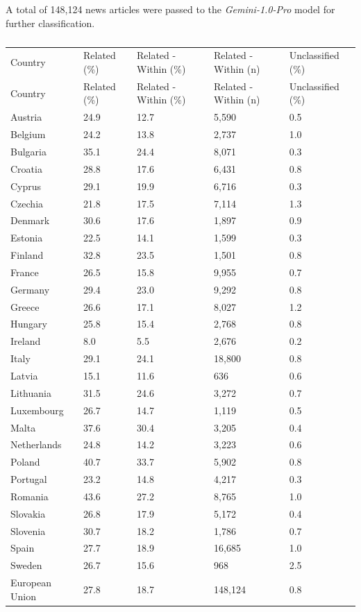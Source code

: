\documentclass[
]{agujournal2019}
\begin{document}
A total of 148,124 news articles were passed to the
\emph{Gemini-1.0-Pro} model for further classification.

\begin{longtable}[]{@{}lllll@{}}

\caption{\label{tbl-classstage1}Broad classification results}

\tabularnewline

\caption{}\label{T_9487f}\tabularnewline
\toprule\noalign{}
Country & Related (\%) & Related - Within (\%) & Related - Within (n) &
Unclassified (\%) \\
\midrule\noalign{}
\endfirsthead
\toprule\noalign{}
Country & Related (\%) & Related - Within (\%) & Related - Within (n) &
Unclassified (\%) \\
\midrule\noalign{}
\endhead
\bottomrule\noalign{}
\endlastfoot
Austria & 24.9 & 12.7 & 5,590 & 0.5 \\
Belgium & 24.2 & 13.8 & 2,737 & 1.0 \\
Bulgaria & 35.1 & 24.4 & 8,071 & 0.3 \\
Croatia & 28.8 & 17.6 & 6,431 & 0.8 \\
Cyprus & 29.1 & 19.9 & 6,716 & 0.3 \\
Czechia & 21.8 & 17.5 & 7,114 & 1.3 \\
Denmark & 30.6 & 17.6 & 1,897 & 0.9 \\
Estonia & 22.5 & 14.1 & 1,599 & 0.3 \\
Finland & 32.8 & 23.5 & 1,501 & 0.8 \\
France & 26.5 & 15.8 & 9,955 & 0.7 \\
Germany & 29.4 & 23.0 & 9,292 & 0.8 \\
Greece & 26.6 & 17.1 & 8,027 & 1.2 \\
Hungary & 25.8 & 15.4 & 2,768 & 0.8 \\
Ireland & 8.0 & 5.5 & 2,676 & 0.2 \\
Italy & 29.1 & 24.1 & 18,800 & 0.8 \\
Latvia & 15.1 & 11.6 & 636 & 0.6 \\
Lithuania & 31.5 & 24.6 & 3,272 & 0.7 \\
Luxembourg & 26.7 & 14.7 & 1,119 & 0.5 \\
Malta & 37.6 & 30.4 & 3,205 & 0.4 \\
Netherlands & 24.8 & 14.2 & 3,223 & 0.6 \\
Poland & 40.7 & 33.7 & 5,902 & 0.8 \\
Portugal & 23.2 & 14.8 & 4,217 & 0.3 \\
Romania & 43.6 & 27.2 & 8,765 & 1.0 \\
Slovakia & 26.8 & 17.9 & 5,172 & 0.4 \\
Slovenia & 30.7 & 18.2 & 1,786 & 0.7 \\
Spain & 27.7 & 18.9 & 16,685 & 1.0 \\
Sweden & 26.7 & 15.6 & 968 & 2.5 \\
European Union & 27.8 & 18.7 & 148,124 & 0.8 \\

\end{longtable}
\end{document}
